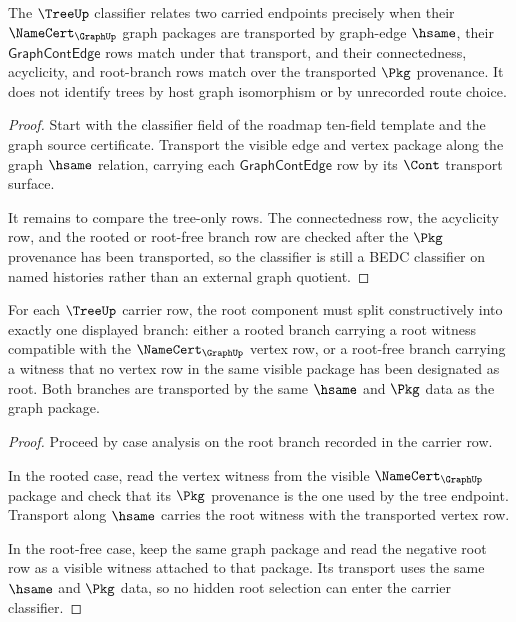 \begin{theorem}\label{thm:treeup-classifier-obligation}
The $\TreeUp$ classifier relates two carried endpoints precisely when their
$\NameCert_{\GraphUp}$ graph packages are transported by graph-edge $\hsame$,
their $\mathsf{GraphContEdge}$ rows match under that transport, and their
connectedness, acyclicity, and root-branch rows match over the transported
$\Pkg$ provenance. It does not identify trees by host graph isomorphism or by
unrecorded route choice.
\end{theorem}
\begin{proof}
Start with the classifier field of the roadmap ten-field template and the
graph source certificate. Transport the visible edge and vertex package along
the graph $\hsame$ relation, carrying each $\mathsf{GraphContEdge}$ row by its
$\Cont$ transport surface.

It remains to compare the tree-only rows. The connectedness row, the
acyclicity row, and the rooted or root-free branch row are checked after the
$\Pkg$ provenance has been transported, so the classifier is still a BEDC
classifier on named histories rather than an external graph quotient.
\end{proof}

\begin{theorem}\label{thm:treeup-root-witness-obligation}
For each $\TreeUp$ carrier row, the root component must split constructively
into exactly one displayed branch: either a rooted branch carrying a root
witness compatible with the $\NameCert_{\GraphUp}$ vertex row, or a root-free
branch carrying a witness that no vertex row in the same visible package has
been designated as root. Both branches are transported by the same $\hsame$
and $\Pkg$ data as the graph package.
\end{theorem}
\begin{proof}
Proceed by case analysis on the root branch recorded in the carrier row.

In the rooted case, read the vertex witness from the visible
$\NameCert_{\GraphUp}$ package and check that its $\Pkg$ provenance is the one
used by the tree endpoint. Transport along $\hsame$ carries the root witness
with the transported vertex row.

In the root-free case, keep the same graph package and read the negative root
row as a visible witness attached to that package. Its transport uses the
same $\hsame$ and $\Pkg$ data, so no hidden root selection can enter the
carrier classifier.
\end{proof}

